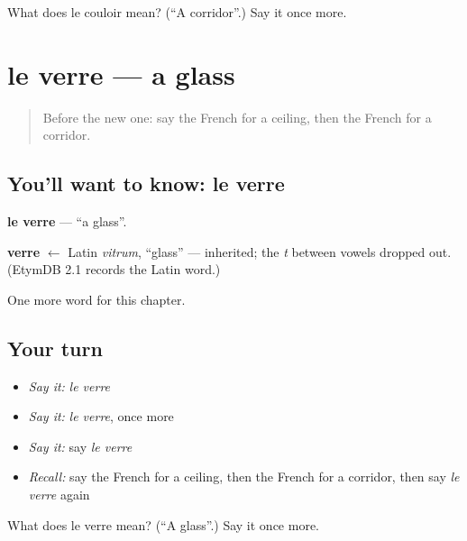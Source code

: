 \begin{tcolorbox}[breakable,colback=teal!4,colframe=teal!35!black,title={Before you move on}]
What does le couloir mean? (\textquotedblleft{}A corridor\textquotedblright{}.) Say it once more.
\end{tcolorbox}
\section[le verre]{le verre — a glass}

\label{lesson:FR-C76-verre}



\begin{quote}
Before the new one: say the French for a ceiling, then the French for a corridor.
\end{quote}

\subsection*{You'll want to know: le verre}
\textbf{le verre} — \textquotedblleft{}a glass\textquotedblright{}.

\begin{cousinweb}
\textbf{verre} $\leftarrow$ Latin \emph{vitrum}, \textquotedblleft{}glass\textquotedblright{} — inherited; the \emph{t} between vowels dropped out. (EtymDB 2.1 records the Latin word.)
\end{cousinweb}

\begin{grammarlens}[title={What you've built}]
One more word for this chapter.
\end{grammarlens}

\subsection*{Your turn}
\begin{itemize}
\raggedright
  \item \emph{Say it:} \emph{le verre}
  \item \emph{Say it:} \emph{le verre}, once more
  \item \emph{Say it:} say \emph{le verre}
  \item \emph{Recall:} say the French for a ceiling, then the French for a corridor, then say \emph{le verre} again
\end{itemize}

\begin{tcolorbox}[breakable,colback=teal!4,colframe=teal!35!black,title={Before you move on}]
What does le verre mean? (\textquotedblleft{}A glass\textquotedblright{}.) Say it once more.
\end{tcolorbox}
